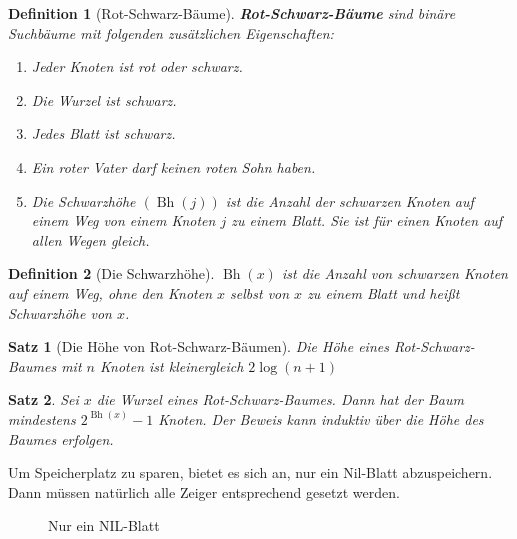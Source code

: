 \documentclass[ngerman,draft,parskip=half*,twoside]{scrreprt}
\theoremstyle{break}
\newtheorem{satz}{Satz}[chapter]
\newtheorem{definition}{Definition}[chapter]
\theoremstyle{nonumberbreak}
\DeclareMathOperator{\Bh}{Bh}       %
\begin{document}
\begin{definition}[Rot-Schwarz-Bäume]
   \textbf{Rot-Schwarz-Bäume} sind binäre Suchbäume mit folgenden zusätzlichen Eigenschaften:
      \begin{enumerate}
	          \item Jeder Knoten ist rot oder schwarz.
	          \item Die Wurzel ist schwarz.
	          \item Jedes Blatt ist schwarz.
	          \item Ein roter Vater darf keinen roten Sohn haben.
	          \item Die Schwarzhöhe $(\Bh(j))$ ist die Anzahl der schwarzen Knoten auf einem Weg von einem Knoten $j$ zu einem
		  Blatt. Sie ist für einen Knoten auf allen Wegen gleich.
      \end{enumerate}
\end{definition}

\begin{definition}[Die Schwarzhöhe]
  $\Bh(x)$ ist die Anzahl von schwarzen Knoten auf einem Weg, ohne den Knoten $x$  selbst von $x$ zu einem Blatt und heißt
  Schwarzhöhe von $x$.
\end{definition}

\begin{satz}[Die Höhe von Rot-Schwarz-Bäumen] \label{rshoehe}
  Die Höhe eines Rot-Schwarz-Baumes mit $n$ Knoten ist kleinergleich $2\log(n+1)$
\end{satz}
  
\begin{satz}\label{schwarzhoehe}
Sei $x$ die Wurzel eines Rot-Schwarz-Baumes. Dann hat der Baum mindestens $2^{\Bh(x)}-1$ Knoten.
  Der Beweis kann induktiv über die Höhe des Baumes erfolgen.
\end{satz}

Um Speicherplatz zu sparen, bietet es sich an, nur ein Nil-Blatt abzuspeichern. Dann müssen natürlich alle Zeiger entsprechend gesetzt
werden.
 
 \begin{figure}[H]
    \centering
    \caption{Nur ein NIL-Blatt}
    \label{241103c}
 \end{figure}
\end{document}
